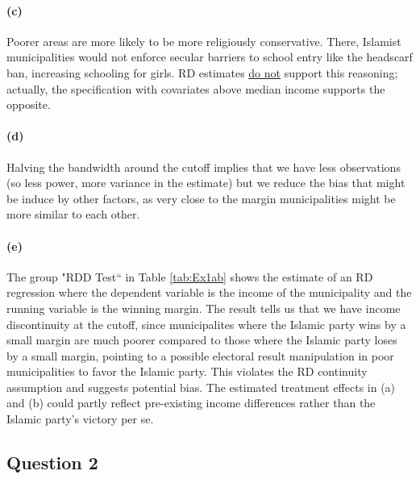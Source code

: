 \documentclass{scrartcl}
\begin{document}
\paragraph*{(c)}
Poorer areas are more likely to be more religiously conservative. There, Islamist municipalities would not enforce secular barriers to school entry like the headscarf ban, increasing schooling for girls. RD estimates \underline{do not} support this reasoning; actually, the specification with covariates above median income supports the opposite.   

\paragraph*{(d)}
Halving the bandwidth around the cutoff implies that we have less observations (so less power, more variance in the estimate) but we reduce the bias that might be induce by other factors, as very close to the margin municipalities might be more similar to each other.  


\paragraph*{(e)}
The group "RDD Test`` in Table \ref{tab:Ex1ab} shows the estimate of an RD regression where the dependent variable is the income of the municipality and the running variable is the winning margin. The result tells us that we have income discontinuity at the cutoff, since municipalites where the Islamic party wins by a small margin are much poorer compared to those where the Islamic party loses by a small margin, pointing to a possible electoral result manipulation in poor municipalities to favor the Islamic party. This violates the RD continuity assumption and suggests potential bias. The estimated treatment effects in (a) and (b) could partly reflect pre-existing income differences rather than the Islamic party’s victory per se.

\subsection*{Question 2} %
\end{document}
